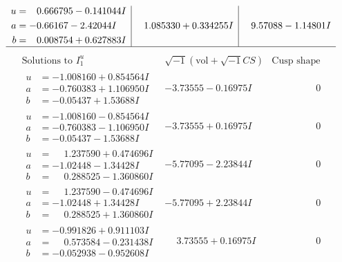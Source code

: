 \documentclass[1p]{elsarticle_modified}
\theoremstyle{definition}
\newcommand{\I}{\sqrt{-1}}
\begin{document}
$$\begin{array}{c|c|c}
\begin{aligned}
u &= \phantom{-}0.666795 - 0.141044 I \\
a &= -0.66167 - 2.42044 I \\
b &= \phantom{-}0.008754 + 0.627883 I\end{aligned}
 & \phantom{-}1.085330 + 0.334255 I & \phantom{-}9.57088 - 1.14801 I\\
 \hline 
 \end{array}$$\newpage$$\begin{array}{c|c|c}  
\text{Solutions to }I^u_{1}& \I (\text{vol} + \sqrt{-1}CS) & \text{Cusp shape}\\
 \hline 
\begin{aligned}
u &= -1.008160 + 0.854564 I \\
a &= -0.760383 + 1.106950 I \\
b &= -0.05437 + 1.53688 I\end{aligned}
 & -3.73555 - 0.16975 I & \phantom{-0.000000 } 0 \\ \hline\begin{aligned}
u &= -1.008160 - 0.854564 I \\
a &= -0.760383 - 1.106950 I \\
b &= -0.05437 - 1.53688 I\end{aligned}
 & -3.73555 + 0.16975 I & \phantom{-0.000000 } 0 \\ \hline\begin{aligned}
u &= \phantom{-}1.237590 + 0.474696 I \\
a &= -1.02448 - 1.34428 I \\
b &= \phantom{-}0.288525 - 1.360860 I\end{aligned}
 & -5.77095 - 2.23844 I & \phantom{-0.000000 } 0 \\ \hline\begin{aligned}
u &= \phantom{-}1.237590 - 0.474696 I \\
a &= -1.02448 + 1.34428 I \\
b &= \phantom{-}0.288525 + 1.360860 I\end{aligned}
 & -5.77095 + 2.23844 I & \phantom{-0.000000 } 0 \\ \hline\begin{aligned}
u &= -0.991826 + 0.911103 I \\
a &= \phantom{-}0.573584 - 0.231438 I \\
b &= -0.052938 - 0.952608 I\end{aligned}
 & \phantom{-}3.73555 + 0.16975 I & \phantom{-0.000000 } 0 \\ \hline\begin{aligned}

\end{aligned}
\end{array}$$
\end{document}
